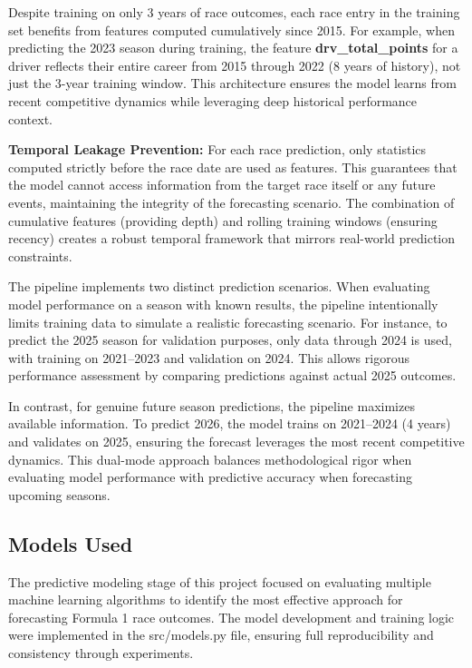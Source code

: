 \documentclass[11pt,a4paper]{article}
\begin{document}
Despite training on only 3 years of race outcomes, each race entry in the training set benefits from features computed cumulatively since 2015. For example, when predicting the 2023 season during training, the feature \textbf{drv\_total\_points} for a driver reflects their entire career from 2015 through 2022 (8 years of history), not just the 3-year training window. This architecture ensures the model learns from recent competitive dynamics while leveraging deep historical performance context.

\textbf{Temporal Leakage Prevention:} For each race prediction, only statistics computed strictly before the race date are used as features. This guarantees that the model cannot access information from the target race itself or any future events, maintaining the integrity of the forecasting scenario. The combination of cumulative features (providing depth) and rolling training windows (ensuring recency) creates a robust temporal framework that mirrors real-world prediction constraints.

The pipeline implements two distinct prediction scenarios. When evaluating model performance on a season with known results, the pipeline intentionally limits training data to simulate a realistic forecasting scenario. For instance, to predict the 2025 season for validation purposes, only data through 2024 is used, with training on 2021–2023 and validation on 2024. This allows rigorous performance assessment by comparing predictions against actual 2025 outcomes.

In contrast, for genuine future season predictions, the pipeline maximizes available information. To predict 2026, the model trains on 2021–2024 (4 years) and validates on 2025, ensuring the forecast leverages the most recent competitive dynamics. This dual-mode approach balances methodological rigor when evaluating model performance with predictive accuracy when forecasting upcoming seasons.

\subsection{Models Used}
\label{subsec:models}

The predictive modeling stage of this project focused on evaluating multiple machine learning algorithms to identify the most effective approach for forecasting Formula 1 race outcomes. The model development and training logic were implemented in the src/models.py file, ensuring full reproducibility and consistency through experiments.
\end{document}
